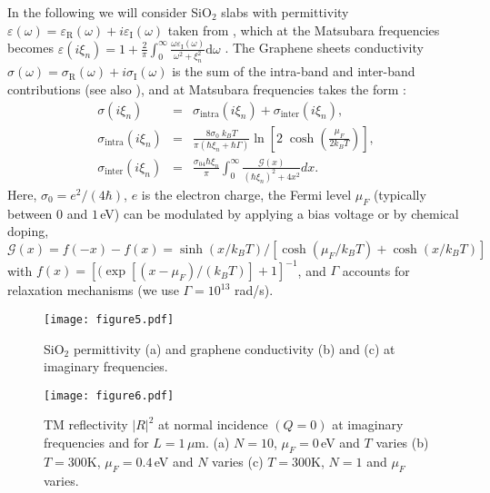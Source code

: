 \documentclass[aps,pra,superscriptaddress,amsmath,amssymb,showpacs,twocolumn,notitlepage]{revtex4-1}
\begin{document}
In the following we will consider SiO$_2$ slabs with permittivity $\varepsilon(\omega)=\varepsilon_\textrm{R}(\omega)+i \varepsilon_\textrm{I}(\omega)$ taken from \cite{Palik}, which at the Matsubara frequencies becomes  $ \varepsilon(i\xi_n)=1+\frac{2}{\pi}\int_0^\infty\frac{\omega\varepsilon_{\textrm{I}}(\omega)}{\omega^2+\xi_n^2}\textrm{d}\omega$ \cite{LLelec}.
The Graphene sheets conductivity $\sigma(\omega)=\sigma_\textrm{R}(\omega)+i\sigma_\textrm{I}(\omega)$ is the sum of the intra-band and inter-band contributions \cite{Falkovsky2008} (see also \cite{Falkovsky2007,Abajo2011,Ferrari2015}), and at Matsubara  frequencies takes the form {\cite{note_sigma}}:
%
\begin{eqnarray}
\sigma(i\xi_n)&=&\sigma_\textrm{intra}(i\xi_n)+\sigma_\textrm{inter}(i\xi_n), \label{eq:sigma}\\
\sigma_\textrm{intra}(i\xi_n)&=&\frac{8\sigma_0\;k_BT}{\pi(\hbar\xi_n+\hbar\Gamma)}\ln\left[2\;\cosh\left(\frac{\mu_F}{2k_BT}\right)\right], \nonumber\\
\sigma_\textrm{inter}(i\xi_n)&=&
\frac{\sigma_04\hbar\xi_n}{\pi}\int_0^{\infty}\frac{\mathcal{G}\left(x\right)}{(\hbar\xi_n)^2+4x^2}dx.\nonumber
\end{eqnarray}
%
Here, $\sigma_0=e^2/(4\hbar)$, $e$ is the electron charge, the Fermi level $\mu_F$ (typically between $0$ and $1\,$eV) can be modulated by applying a bias voltage or by chemical doping, $\mathcal{G}(x)=f(-x)-f(x)=\sinh(x/k_BT)/[\cosh(\mu_F/k_BT)+\cosh(x/k_BT)]$ with $f(x)=[(\exp[(x-\mu_F)/(k_BT)]+1]^{-1}$, and $\Gamma$ accounts for relaxation mechanisms  (we use $\Gamma=10^{13}$ rad/s). 


\begin{figure}[!ht]
\texttt{[image: figure5.pdf]}
\caption{\label{fig:figure_5} \footnotesize SiO$_2$ permittivity (a) and graphene conductivity (b) and (c) at imaginary frequencies.}
\end{figure}


\begin{figure}[!ht]
\texttt{[image: figure6.pdf]}
\caption{\footnotesize TM reflectivity $|R|^2$ at normal incidence $(Q=0)$ at imaginary frequencies and for $L=1\,\mu$m. (a) $N=10$, $\mu_F=0\,$eV and $T$ varies (b) $T=300$K, $\mu_F=0.4\,$eV and $N$ varies (c) $T=300$K, $N=1$ and $\mu_F$ varies.\label{fig:figure_6}}
\end{figure}
\end{document}
